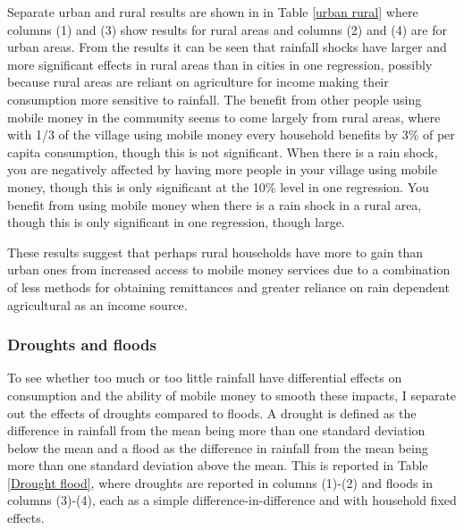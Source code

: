 Separate urban and rural results are shown in in Table \ref{urban rural} where columns (1) and (3) show results for rural areas and columns (2) and (4) are for urban areas. From the results it can be seen that rainfall shocks have larger and more significant effects in rural areas than in cities in one regression, possibly because rural areas are reliant on agriculture for income making their consumption more sensitive to rainfall. The benefit from other people using mobile money in the community seems to come largely from rural areas, where with 1/3 of the village using mobile money every household benefits by 3\% of per capita consumption, though this is not significant. When there is a rain shock, you are negatively affected by having more people in your village using mobile money, though this is only significant at the 10\% level in one regression. You benefit from using mobile money when there is a rain shock in a rural area, though this is only significant in one regression, though large.   



These results suggest that perhaps rural households have more to gain than urban ones from increased access to mobile money services due to a combination of less methods for obtaining remittances and greater reliance on rain dependent agricultural as an income source. 

\subsubsection{Droughts and floods}
To see whether too much or too little rainfall have differential effects on consumption and the ability of mobile money to smooth these impacts, I separate out the effects of droughts compared to floods. A drought is defined as the difference in rainfall from the mean being more than one standard deviation below the mean and a flood as the difference in rainfall from the mean being more than one standard deviation above the mean. This is reported in Table \ref{Drought flood}, where droughts are reported in columns (1)-(2) and floods in columns (3)-(4), each as a simple difference-in-difference and with household fixed effects. 

